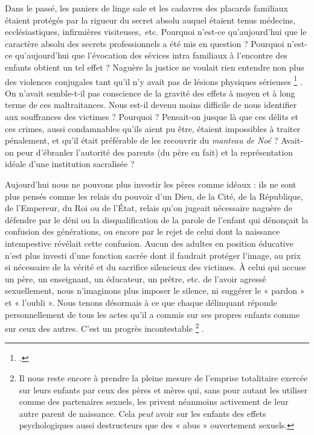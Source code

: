  Dans le passé, les paniers de linge sale et les cadavres des placards familiaux étaient protégés par la rigueur du secret absolu auquel étaient tenus médecins, ecclésiastiques, infirmières visiteuses,~etc. Pourquoi n'est-ce qu'aujourd'hui que le caractère absolu des secrets professionnels a été mis en question ? Pourquoi n'est-ce qu'aujourd'hui que l'évocation des sévices intra familiaux à l'encontre des enfants obtient un tel effet ? Naguère la justice ne voulait rien entendre non plus des violences conjugales tant qu'il n'y avait pas de lésions physiques sérieuses%
\footnote{.}%
. On n'avait semble-t-il pas conscience de la gravité des effets à moyen et à long terme de ces maltraitances. Nous est-il devenu moins difficile de nous identifier aux souffrances des victimes ? Pourquoi ? Pensait-on jusque là que ces délits et ces crimes, aussi condamnables qu'ils aient pu être, étaient impossibles à traiter pénalement, et qu'il était préférable de les recouvrir du \emph{manteau de Noé} ? Avait-on peur d'ébranler l'autorité des parents (du père en fait) et la représentation idéale d'une institution sacralisée ? 

 Aujourd'hui nous ne pouvons plus investir les pères comme idéaux : ils ne sont plus pensés comme les relais du pouvoir d'un Dieu, de la Cité, de la République, de l'Empereur, du Roi ou de l'État, relais qu'on jugeait nécessaire naguère de défendre par le déni ou la disqualification de la parole de l'enfant qui dénonçait la confusion des générations, ou encore par le rejet de celui dont la naissance intempestive révélait cette confusion. Aucun des adultes en position éducative n'est plus investi d'une fonction sacrée dont il faudrait protéger l'image, au prix si nécessaire de la vérité et du sacrifice silencieux des victimes. À celui qui accuse un père, un enseignant, un éducateur, un prêtre, etc. de l'avoir agressé sexuellement, nous n'imaginons plus imposer le silence, ni suggérer le « pardon » et « l'oubli ». Nous tenons désormais à ce que chaque délinquant réponde personnellement de tous les actes qu'il a commis sur ses propres enfants comme sur ceux des autres. C'est un progrès %
 incontestable%
\footnote{Il nous reste encore à prendre la pleine mesure de l'emprise totalitaire exercée sur leurs enfants par ceux des pères et mères qui, sans pour autant les utiliser comme des partenaires sexuels, les privent néanmoins activement de leur autre parent de naissance. Cela \emph{peut} avoir sur les enfants des effets psychologiques aussi destructeurs que des « abus » ouvertement sexuels.}%
. 

